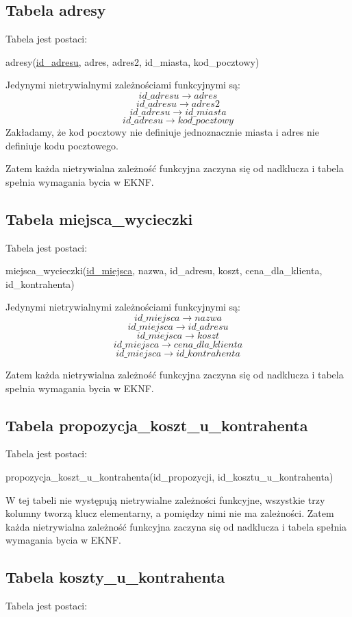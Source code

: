 \documentclass[a4paper,12pt]{mwart}
\begin{document}
\subsection{Tabela adresy}
Tabela jest postaci:

adresy(\underline{id\_adresu}, adres, adres2, id\_miasta, kod\_pocztowy)

\noindent Jedynymi nietrywialnymi zależnościami funkcyjnymi są:
$$   id\_adresu  \rightarrow adres $$
$$   id\_adresu  \rightarrow adres2 $$
$$   id\_adresu  \rightarrow id\_miasta $$
$$   id\_adresu  \rightarrow kod\_pocztowy $$
Zakładamy, że kod pocztowy nie definiuje jednoznacznie miasta i  adres nie definiuje kodu pocztowego.


Zatem każda nietrywialna zależność funkcyjna zaczyna się od nadklucza i tabela  spełnia wymagania bycia w EKNF.


\subsection{Tabela miejsca\_wycieczki}
Tabela jest postaci:

miejsca\_wycieczki(\underline{id\_miejsca}, nazwa, id\_adresu, koszt, cena\_dla\_klienta, id\_kontrahenta)

\noindent Jedynymi nietrywialnymi zależnościami funkcyjnymi są:
$$   id\_miejsca  \rightarrow nazwa $$
$$   id\_miejsca  \rightarrow id\_adresu $$
$$   id\_miejsca  \rightarrow koszt $$
$$   id\_miejsca  \rightarrow cena\_dla\_klienta $$
$$   id\_miejsca  \rightarrow id\_kontrahenta $$


Zatem każda nietrywialna zależność funkcyjna zaczyna się od nadklucza i tabela  spełnia wymagania bycia w EKNF.

\subsection{Tabela propozycja\_koszt\_u\_kontrahenta}
Tabela jest postaci:

propozycja\_koszt\_u\_kontrahenta(id\_propozycji, id\_kosztu\_u\_kontrahenta)

W tej tabeli nie występują nietrywialne zależności funkcyjne, wszystkie trzy kolumny tworzą klucz elementarny, a pomiędzy nimi nie ma zależności.
Zatem każda nietrywialna zależność funkcyjna zaczyna się od nadklucza i tabela  spełnia wymagania bycia w EKNF.


\subsection{Tabela koszty\_u\_kontrahenta}
Tabela jest postaci:
\end{document}
